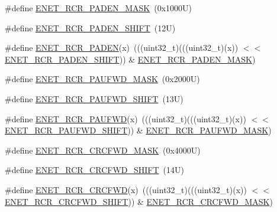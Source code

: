 \begin{DoxyCompactItemize}
\item 
\#define \mbox{\hyperlink{group___e_n_e_t___register___masks_gab6a8c4abb6a9bd525324ca790a9255bf}{E\+N\+E\+T\+\_\+\+R\+C\+R\+\_\+\+P\+A\+D\+E\+N\+\_\+\+M\+A\+SK}}~(0x1000\+U)
\item 
\#define \mbox{\hyperlink{group___e_n_e_t___register___masks_ga0aa5cc8815e76a8054a4dc13c5006118}{E\+N\+E\+T\+\_\+\+R\+C\+R\+\_\+\+P\+A\+D\+E\+N\+\_\+\+S\+H\+I\+FT}}~(12\+U)
\item 
\#define \mbox{\hyperlink{group___e_n_e_t___register___masks_ga74b4738aeb8d5d1e8c7c5ae4a8a85d27}{E\+N\+E\+T\+\_\+\+R\+C\+R\+\_\+\+P\+A\+D\+EN}}(x)~(((uint32\+\_\+t)(((uint32\+\_\+t)(x)) $<$$<$ \mbox{\hyperlink{group___e_n_e_t___register___masks_ga0aa5cc8815e76a8054a4dc13c5006118}{E\+N\+E\+T\+\_\+\+R\+C\+R\+\_\+\+P\+A\+D\+E\+N\+\_\+\+S\+H\+I\+FT}})) \& \mbox{\hyperlink{group___e_n_e_t___register___masks_gab6a8c4abb6a9bd525324ca790a9255bf}{E\+N\+E\+T\+\_\+\+R\+C\+R\+\_\+\+P\+A\+D\+E\+N\+\_\+\+M\+A\+SK}})
\item 
\#define \mbox{\hyperlink{group___e_n_e_t___register___masks_ga664fa2802383748f83527ad422cede34}{E\+N\+E\+T\+\_\+\+R\+C\+R\+\_\+\+P\+A\+U\+F\+W\+D\+\_\+\+M\+A\+SK}}~(0x2000\+U)
\item 
\#define \mbox{\hyperlink{group___e_n_e_t___register___masks_gace2ee9a69ab345416d6f15835b49f689}{E\+N\+E\+T\+\_\+\+R\+C\+R\+\_\+\+P\+A\+U\+F\+W\+D\+\_\+\+S\+H\+I\+FT}}~(13\+U)
\item 
\#define \mbox{\hyperlink{group___e_n_e_t___register___masks_ga8b450ecf2692e80701aac14719ea0e58}{E\+N\+E\+T\+\_\+\+R\+C\+R\+\_\+\+P\+A\+U\+F\+WD}}(x)~(((uint32\+\_\+t)(((uint32\+\_\+t)(x)) $<$$<$ \mbox{\hyperlink{group___e_n_e_t___register___masks_gace2ee9a69ab345416d6f15835b49f689}{E\+N\+E\+T\+\_\+\+R\+C\+R\+\_\+\+P\+A\+U\+F\+W\+D\+\_\+\+S\+H\+I\+FT}})) \& \mbox{\hyperlink{group___e_n_e_t___register___masks_ga664fa2802383748f83527ad422cede34}{E\+N\+E\+T\+\_\+\+R\+C\+R\+\_\+\+P\+A\+U\+F\+W\+D\+\_\+\+M\+A\+SK}})
\item 
\#define \mbox{\hyperlink{group___e_n_e_t___register___masks_gab00e088ecf7a8439af6dfc86951e65a9}{E\+N\+E\+T\+\_\+\+R\+C\+R\+\_\+\+C\+R\+C\+F\+W\+D\+\_\+\+M\+A\+SK}}~(0x4000\+U)
\item 
\#define \mbox{\hyperlink{group___e_n_e_t___register___masks_gacc33ea25694cc26264d3bec46a69fa2d}{E\+N\+E\+T\+\_\+\+R\+C\+R\+\_\+\+C\+R\+C\+F\+W\+D\+\_\+\+S\+H\+I\+FT}}~(14\+U)
\item 
\#define \mbox{\hyperlink{group___e_n_e_t___register___masks_ga677b2a53767002167426b09965e7e51d}{E\+N\+E\+T\+\_\+\+R\+C\+R\+\_\+\+C\+R\+C\+F\+WD}}(x)~(((uint32\+\_\+t)(((uint32\+\_\+t)(x)) $<$$<$ \mbox{\hyperlink{group___e_n_e_t___register___masks_gacc33ea25694cc26264d3bec46a69fa2d}{E\+N\+E\+T\+\_\+\+R\+C\+R\+\_\+\+C\+R\+C\+F\+W\+D\+\_\+\+S\+H\+I\+FT}})) \& \mbox{\hyperlink{group___e_n_e_t___register___masks_gab00e088ecf7a8439af6dfc86951e65a9}{E\+N\+E\+T\+\_\+\+R\+C\+R\+\_\+\+C\+R\+C\+F\+W\+D\+\_\+\+M\+A\+SK}})
$$
\end{DoxyCompactItemize}

